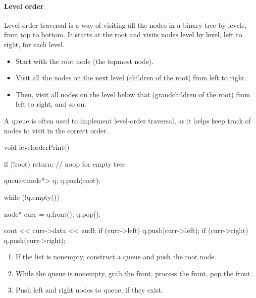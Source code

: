 \documentclass{report}
\begin{document}
\paragraph{Level order}
\bigbreak \noindent \bigbreak \noindent 
Level-order traversal is a way of visiting all the nodes in a binary tree by levels, from top to bottom. It starts at the root and visits nodes level by level, left to right, for each level.
\begin{itemize}
    \item Start with the root node (the topmost node).
    \item Visit all the nodes on the next level (children of the root) from left to right.
    \item Then, visit all nodes on the level below that (grandchildren of the root) from left to right, and so on.
\end{itemize}
A queue is often used to implement level-order traversal, as it helps keep track of nodes to visit in the correct order.
\bigbreak \noindent 
\begin{cppcode}
    void levelorderPrint() {
        if (!root) return; // noop for empty tree

        queue<node*> q;
        q.push(root);

        while (!q.empty()) {
            node* curr = q.front();
            q.pop();

            cout << curr->data << endl;
            if (curr->left) {
                q.push(curr->left);
            }
            if (curr->right) {
                q.push(curr->right);
            }
        }
    }
\end{cppcode}
\begin{enumerate}
    \item If the list is nonempty, construct a queue and push the root node.
    \item While the queue is nonempty, grab the front, process the front, pop the front.
    \item Push left and right nodes to queue, if they exist.
\end{enumerate}

\bigbreak \noindent 
\pagebreak \bigbreak \noindent 
\end{document}
